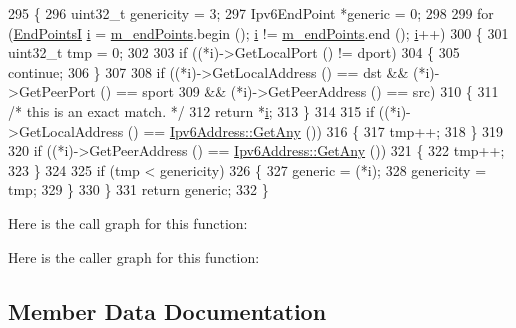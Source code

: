 \begin{DoxyCode}
295 \{
296   uint32\_t genericity = 3;
297   Ipv6EndPoint *\textcolor{keyword}{generic} = 0;
298 
299   \textcolor{keywordflow}{for} (\hyperlink{classns3_1_1Ipv6EndPointDemux_a79d7b69805dbd45a902e5e6b375e752b}{EndPointsI} \hyperlink{bernuolliDistribution_8m_a6f6ccfcf58b31cb6412107d9d5281426}{i} = \hyperlink{classns3_1_1Ipv6EndPointDemux_a426db7bf82f46d87aa92afa3c3b927d9}{m\_endPoints}.begin (); \hyperlink{bernuolliDistribution_8m_a6f6ccfcf58b31cb6412107d9d5281426}{i} != 
      \hyperlink{classns3_1_1Ipv6EndPointDemux_a426db7bf82f46d87aa92afa3c3b927d9}{m\_endPoints}.end (); \hyperlink{bernuolliDistribution_8m_a6f6ccfcf58b31cb6412107d9d5281426}{i}++)
300     \{
301       uint32\_t tmp = 0;
302 
303       \textcolor{keywordflow}{if} ((*i)->GetLocalPort () != dport)
304         \{
305           \textcolor{keywordflow}{continue};
306         \}
307 
308       \textcolor{keywordflow}{if} ((*i)->GetLocalAddress () == dst && (*i)->GetPeerPort () == sport
309           && (*i)->GetPeerAddress () == src)
310         \{
311           \textcolor{comment}{/* this is an exact match. */}
312           \textcolor{keywordflow}{return} *\hyperlink{bernuolliDistribution_8m_a6f6ccfcf58b31cb6412107d9d5281426}{i};
313         \}
314 
315       \textcolor{keywordflow}{if} ((*i)->GetLocalAddress () == \hyperlink{classns3_1_1Ipv6Address_a2783e8badfc98c8b0a8508bba6e1b91e}{Ipv6Address::GetAny} ())
316         \{
317           tmp++;
318         \}
319 
320       \textcolor{keywordflow}{if} ((*i)->GetPeerAddress () == \hyperlink{classns3_1_1Ipv6Address_a2783e8badfc98c8b0a8508bba6e1b91e}{Ipv6Address::GetAny} ())
321         \{
322           tmp++;
323         \}
324 
325       \textcolor{keywordflow}{if} (tmp < genericity)
326         \{
327           \textcolor{keyword}{generic} = (*i);
328           genericity = tmp;
329         \}
330     \}
331   \textcolor{keywordflow}{return} \textcolor{keyword}{generic};
332 \}
\end{DoxyCode}


Here is the call graph for this function\+:




Here is the caller graph for this function\+:




\subsection{Member Data Documentation}
